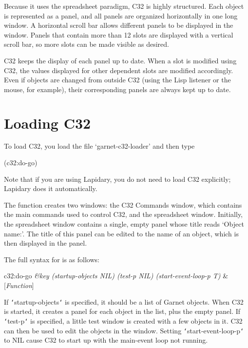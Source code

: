 Because it uses the spreadsheet paradigm, C32 is highly structured.  Each
object is represented as a panel, and all panels are organized
horizontally in one long window.  A horizontal scroll bar allows different
panels to be displayed in the window.  Panels that contain more than 12
slots are displayed with a vertical scroll bar, so more slots can be made
visible as desired.

C32 keeps the display of each panel up to date.  When a slot is modified
using C32, the values displayed for other dependent slots are modified
accordingly.  Even if objects are changed from outside C32 (using the Lisp
listener or the mouse, for example), their corresponding panels are always
kept up to date.



\chapter{Loading C32}

To load C32, you load the file `garnet-c32-loader' and then type
\begin{programexample}
(c32:do-go)
\end{programexample}
Note that if you are using Lapidary, you do not need to load C32 explicitly;
Lapidary does it automatically.

The function  creates two windows: the C32 Commands
window, which contains the main commands used to control C32, and the
spreadsheet window.  Initially, the spreadsheet window contains a single,
empty panel whose title reads `Object name:'.  The title of this panel can
be edited to the name of an object, which is then displayed in the panel.

The full syntax for  is as follows:
\begin{programexample}
c32:do-go {\it \&key (startup-objects NIL) (test-p NIL) (start-event-loop-p T)}  & [{\it Function}]
\end{programexample}
If {\tt\char`\<}startup-objects{\tt\char`\>} is specified, it should be a list of Garnet objects.
When C32 is started, it creates a panel for each object in the list, plus
the empty panel.  If {\tt\char`\<}test-p{\tt\char`\>} is specified, a little test window is
created with a few objects in it.  C32 can then be used to edit the
objects in the window.  Setting {\tt\char`\<}start-event-loop-p{\tt\char`\>} to NIL cause C32 to
start up with the main-event loop not running.



